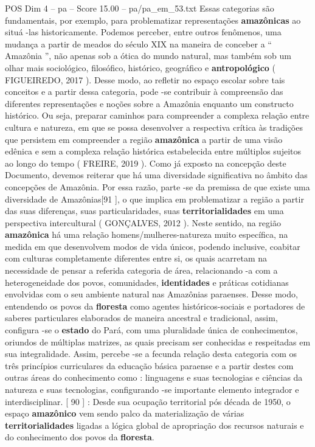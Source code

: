 \begin{textsample}{POS Dim 4 – pa – Score 15.00 – pa/pa\_em\_53.txt}
Essas categorias são fundamentais, por exemplo, para problematizar representações \textbf{amazônicas} ao situá -las historicamente.
Podemos perceber, entre outros fenômenos, uma mudança a partir de meados do século XIX na maneira de conceber a “ Amazônia ”, não apenas sob a ótica do mundo natural, mas também sob um olhar mais sociológico, filosófico, histórico, geográfico e \textbf{antropológico} ( FIGUEIREDO, 2017 ).
Desse modo, ao refletir no espaço escolar sobre tais conceitos e a partir dessa categoria, pode -se contribuir à compreensão das diferentes representações e noções sobre a Amazônia enquanto um constructo histórico.
Ou seja, preparar caminhos para compreender a complexa relação entre cultura e natureza, em que se possa desenvolver a respectiva crítica às tradições que persistem em compreender a região \textbf{amazônica} a partir de uma visão edênica e sem a complexa relação histórica estabelecida entre múltiplos sujeitos ao longo do tempo ( FREIRE, 2019 ).
Como já exposto na concepção deste Documento, devemos reiterar que há uma diversidade significativa no âmbito das concepções de Amazônia.
Por essa razão, parte -se da premissa de que existe uma diversidade de Amazônias[91 ], o que implica em problematizar a região a partir das suas diferenças, suas particularidades, suas \textbf{territorialidades} em uma perspectiva intercultural ( GONÇALVES, 2012 ).
Neste sentido, na região \textbf{amazônica} há uma relação homens/mulheres-natureza muito específica, na medida em que desenvolvem modos de vida únicos, podendo inclusive, coabitar com culturas completamente diferentes entre si, os quais acarretam na necessidade de pensar a referida categoria de área, relacionando -a com a heterogeneidade dos povos, comunidades, \textbf{identidades} e práticas cotidianas envolvidas com o seu ambiente natural nas Amazônias paraenses.
Desse modo, entendendo os povos da \textbf{floresta} como agentes históricos-sociais e portadores de saberes particulares elaborados de maneira ancestral e tradicional, assim, configura -se o \textbf{estado} do Pará, com uma pluralidade única de conhecimentos, oriundos de múltiplas matrizes, as quais precisam ser conhecidas e respeitadas em sua integralidade.
Assim, percebe -se a fecunda relação desta categoria com os três princípios curriculares da educação básica paraense e a partir destes com outras áreas do conhecimento como : linguagens e suas tecnologias e ciências da natureza e suas tecnologias, configurando -se importante elemento integrador e interdisciplinar. [ 90 ] : Desde sua ocupação territorial pós década de 1950, o espaço \textbf{amazônico} vem sendo palco da materialização de várias \textbf{territorialidades} ligadas a lógica global de apropriação dos recursos naturais e do conhecimento dos povos da \textbf{floresta}.

\end{textsample}
